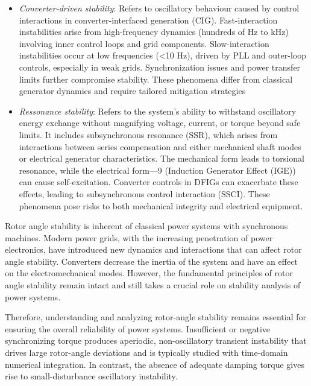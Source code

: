   
\begin{itemize}
    \item \textit{Converter-driven stability}: Refers to oscillatory behaviour caused by control interactions in converter-interfaced generation (CIG). 
    Fast-interaction instabilities arise from high-frequency dynamics (hundreds of Hz to kHz) involving inner control loops and grid components. 
    Slow-interaction instabilities occur at low frequencies (<10 Hz), driven by PLL and outer-loop controls, especially 
    in weak grids. Synchronization issues and power transfer limits further compromise stability. 
    These phenomena differ from classical generator dynamics and require tailored mitigation strategies
    \item \textit{Ressonance stability}: Refers to the system's ability to withstand oscillatory 
    energy exchange without magnifying voltage, current, or torque beyond safe limits. It includes subsynchronous 
    resonance (SSR), which arises from interactions between series compensation and either mechanical shaft modes or 
    electrical generator characteristics. The mechanical form leads to torsional resonance, while the electrical 
    form—9 (Induction Generator Effect (IGE)) can cause self-excitation. Converter controls in DFIGs can exacerbate these 
    effects, leading to subsynchronous control interaction (SSCI). These phenomena pose risks to both mechanical integrity 
    and electrical equipment.
\end{itemize}


Rotor angle stability is inherent of classical power systems with synchronous machines. Modern power grids, with the increasing penetration of 
power electronics, have introduced new dynamics and interactions that can affect rotor angle stability. Converters decrease the inertia of the system
and have an effect on the electromechanical modes. However, the fundamental principles of rotor angle stability remain intact and still takes
a crucial role on stability analysis of power systems.

Therefore, understanding and analyzing rotor-angle stability remains essential for ensuring the overall reliability of power systems. 
Insufficient or negative synchronizing torque produces aperiodic, non-oscillatory transient instability that drives large rotor-angle deviations
and is typically studied with time-domain numerical integration. In contrast, the absence of adequate damping torque gives rise to small-disturbance
oscillatory instability.

